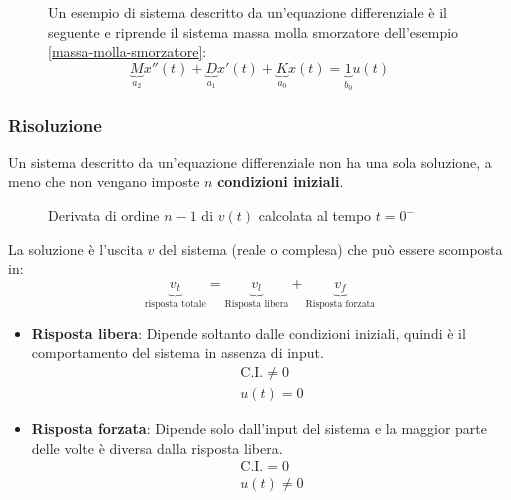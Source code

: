 \documentclass[a4paper]{article}
\begin{document}
\begin{figure}[H]
  \begin{example}
    Un esempio di sistema descritto da un'equazione differenziale è il seguente e
    riprende il sistema massa molla smorzatore dell'esempio \ref{massa-molla-smorzatore}:
    \[
      \underbrace{M}_{a_2} x''(t) + \underbrace{D}_{a_1} x'(t) + \underbrace{K}_{a_0} x(t) =
      \underbrace{1}_{b_0} u(t)
    \] 
  \end{example}
\end{figure}

\subsubsection{Risoluzione}
Un sistema descritto da un'equazione differenziale non ha una sola soluzione, a meno che
non vengano imposte \( n \) \textbf{condizioni iniziali}.
\begin{figure}[H]
  \centering
  \caption{Derivata di ordine \( n-1 \) di \( v(t) \) calcolata al tempo \( t = 0^- \)}
\end{figure}

\noindent
La soluzione è l'uscita \( v \) del sistema (reale o complesa) che può essere scomposta
in:
\[
  \underbrace{v_t}_{\text{risposta totale}} = \underbrace{v_l}_{\text{Risposta libera}} + \underbrace{v_f}_{\text{Risposta forzata}}
\] 
\begin{itemize}
  \item \textbf{Risposta libera}: Dipende soltanto dalle condizioni iniziali, quindi
    è il comportamento del sistema in assenza di input.
    \[
    \begin{aligned}
      \text{C.I.} \neq 0\\
      u(t) = 0
    \end{aligned}
    \] 

  \item \textbf{Risposta forzata}: Dipende solo dall'input del sistema e la maggior parte
    delle volte è diversa dalla risposta libera.
    \[
    \begin{aligned}
      \text{C.I.} = 0\\
      u(t) \neq 0
    \end{aligned}
    \] 
\end{itemize}
\end{document}
